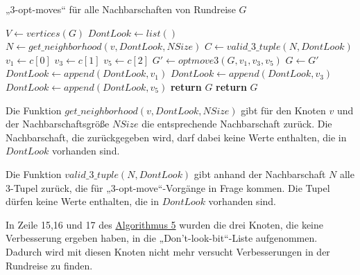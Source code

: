 \begin{algorithm}
  \caption{„3-opt-moves“ für alle Nachbarschaften von Rundreise $G$}\label{alg:ls3opt_run}
\begin{algorithmic}[1]
   
    \State $V \gets vertices(G)$
    \State $DontLook \gets list()$
      \State $N \gets get\_neighborhood(v, DontLook, NSize)$
      \State $C \gets valid\_3\_tuple(N, DontLook)$
        \State $v_1 \gets c[0]$
        \State $v_3 \gets c[1]$
        \State $v_5 \gets c[2]$
        \State $G' \gets optmove3(G, v_1,v_3,v_5)$ 
          \State $G \gets G'$ 
        \Else
          \State $DontLook \gets append(DontLook, v_1)$ 
          \State $DontLook \gets append(DontLook, v_3)$
          \State $DontLook \gets append(DontLook, v_5)$
        \EndIf
      \EndForeach
        \State \textbf{return} $G$ 
      \EndIf
    \EndForeach
    \State \textbf{return} $G$
  \EndProcedure
\end{algorithmic}
\end{algorithm}

\begin{bem}
  Die Funktion $get\_neighborhood(v, DontLook, NSize)$ gibt für den
  Knoten $v$ und der Nachbarschaftsgröße $NSize$ die entsprechende
  Nachbarschaft zurück. Die Nachbarschaft, die zurückgegeben wird, darf
  dabei keine Werte enthalten, die in $DontLook$ vorhanden sind.
\end{bem}

\begin{bem}
Die Funktion $valid\_3\_tuple(N, DontLook)$ gibt anhand der
  Nachbarschaft $N$ alle 3-Tupel zurück, die für „3-opt-move“-Vorgänge
  in Frage kommen. Die Tupel dürfen keine Werte enthalten, die in
  $DontLook$ vorhanden sind.
\end{bem}
\noindent
In Zeile 15,16 und 17 des \hyperref[alg:ls3opt_run]{Algorithmus 5} wurden die drei Knoten, die keine
Verbesserung ergeben haben, in die „Don't-look-bit“-Liste aufgenommen.
Dadurch wird mit diesen Knoten nicht mehr versucht Verbesserungen in der
Rundreise zu finden. 
